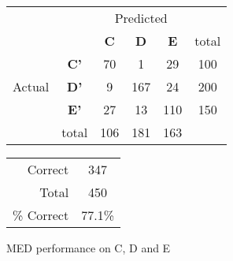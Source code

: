 \begin{figure}[!ht]
\begin{minipage}[b]{0.5\linewidth}
\centering
	\begin{tabular}{ccc|c|c|c}
	 & &\multicolumn{3}{c}{Predicted} &\\
	  & & \bf{C} &  \bf{D} & \bf{E} & total \\
	 \cline{3-6}
	 \multirow{3}{*}{\begin{sideways}Actual\end{sideways}} & \bf{C'}& 70 & 1 & 29 & 100\\
	 \cline{3-6}
	 & \bf{D'}& 9 & 167 & 24 & 200\\
	  \cline{3-6}
	 & \bf{E'}& 27 & 13 & 110 &  150\\
	  \cline{3-6}
	 &total&106&181&163\\
	\end{tabular}
\end{minipage}
\hspace{0.5cm}
\begin{minipage}[b]{0.5\linewidth}
	\begin{tabular}{r|c}
	\hline
	Correct& 347\\
	Total& 450\\
	\hline
	\% Correct& 77.1\%\\
	\hline
	\end{tabular}
\end{minipage}
\vspace{1mm}
\caption{MED performance on C, D and E}
\end{figure}

\clearpage

